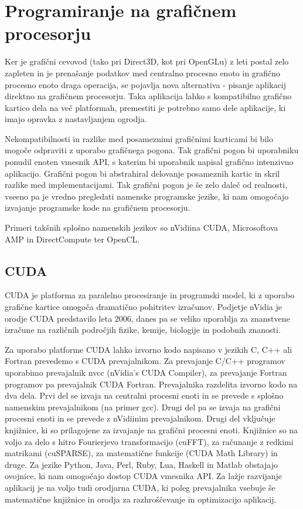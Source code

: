 \chapter{Programiranje na grafičnem\\ procesorju}
\label{sec:gpu}

Ker je grafični cevovod (tako pri Direct3D, kot pri OpenGLu) z leti postal zelo zapleten in je prenašanje podatkov med centralno procesno enoto in grafično procesno enoto draga operacija, se pojavlja nova alternativa - pisanje aplikacij direktno na grafičnem procesorju. Taka aplikacija lahko s kompatibilno grafično kartico dela na več platformah, premestiti je potrebno samo dele aplikacije, ki imajo opravka z nastavljanjem ogrodja. 

Nekompatibilnosti in razlike med posameznimi grafičnimi karticami bi bilo mogoče odpraviti z uporabo grafičnega pogona. Tak grafični pogon bi uporabniku ponudil enoten vmesnik API, s katerim bi uporabnik napisal grafično intenzivno aplikacijo. Grafični pogon bi abstrahiral delovanje posameznih kartic in skril razlike med implementacijami. Tak grafični pogon je še zelo daleč od realnosti, vseeno pa je vredno pregledati namenske programske jezike, ki nam omogočajo izvajanje programske kode na grafičnem procesorju.

Primeri takšnih splošno namenskih jezikov so nVidiina CUDA, Microsoftova AMP in DirectCompute ter OpenCL.

\section{CUDA}
CUDA \cite{cuda} je platforma za paralelno procesiranje in programski model, ki z uporabo grafične kartice omogoča dramatično pohitritev izračunov. Podjetje nVidia je orodje CUDA predstavilo leta 2006, danes pa se veliko uporablja za znanstvene izračune na različnih področjih fizike, kemije, biologije in podobnih znanosti.

Za uporabo platforme CUDA lahko izvorno kodo napisano v jezikih C, C++ ali Fortran prevedemo s CUDA prevajalnikom. Za prevajanje C/C++ programov uporabimo prevajalnik nvcc (nVidia's CUDA Compiler), za prevajanje Fortran programov pa prevajalnik CUDA Fortran. Prevajalnika razdelita izvorno kodo na dva dela. Prvi del se izvaja na centralni procesni enoti in se prevede s splošno namenskim prevajalnikom (na primer gcc). Drugi del pa se izvaja na grafični procesni enoti in se prevede z nVidiinim prevajalnikom. Drugi del vključuje knjižnice, ki so prilagojene za izvajanje na grafični procesni enoti. Knjižnice so na voljo za delo s hitro Fourierjevo transformacijo (cuFFT), za računanje z redkimi matrikami (cuSPARSE), za matematične funkcije (CUDA Math Library) in druge. Za jezike Python, Java, Perl, Ruby, Lua, Haskell in Matlab obstajajo ovojnice, ki nam omogočajo dostop CUDA vmesnika API. Za lažje razvijanje aplikacij je na voljo tudi orodjarna CUDA, ki poleg prevajalnika vsebuje še matematične knjižnice in orodja za razhroščevanje in optimizacijo aplikacij.

